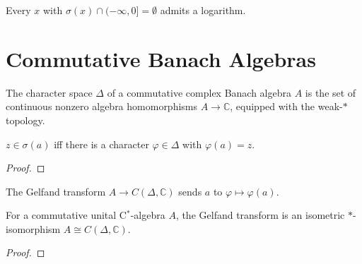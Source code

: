 \begin{theorem}
  \label{thm:banachAlgebra-log}
  \leanok
  Every $x$ with $\sigma(x) \cap (-\infty, 0] = \emptyset$ admits a
  logarithm.
\end{theorem}

\chapter{Commutative Banach Algebras}

\begin{definition}
  \label{def:character-space}
  \leanok
  The character space $\Delta$ of a commutative complex Banach algebra
  $A$ is the set of continuous nonzero algebra homomorphisms $A \to \mathbb{C}$,
  equipped with the weak-$*$ topology.
\end{definition}

\begin{theorem}
  \label{thm:spectrum-via-characters}
  \leanok
  $z \in \sigma(a)$ iff there is a character $\varphi \in \Delta$ with
  $\varphi(a) = z$.
\end{theorem}
\begin{proof}
  \leanok
\end{proof}

\begin{definition}
  \label{def:gelfand-transform}
  \leanok
  The Gelfand transform $A \to C(\Delta, \mathbb{C})$ sends $a$ to
  $\varphi \mapsto \varphi(a)$.
\end{definition}

\begin{theorem}
  \label{thm:gelfand-naimark}
  \leanok
  For a commutative unital C$^{*}$-algebra $A$, the Gelfand transform
  is an isometric $*$-isomorphism $A \cong C(\Delta, \mathbb{C})$.
\end{theorem}
\begin{proof}
  \leanok
\end{proof}


